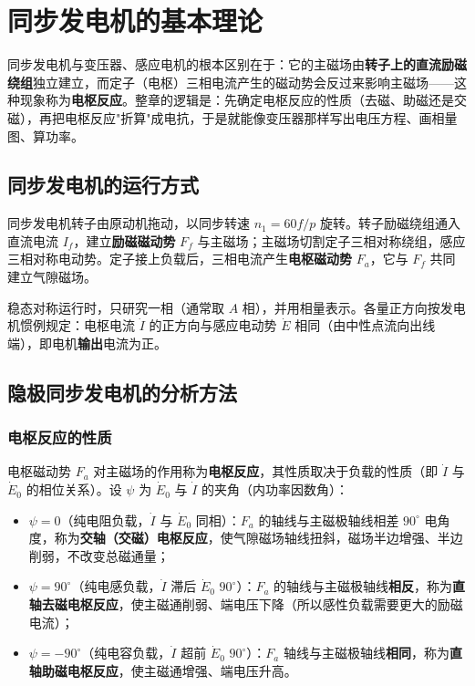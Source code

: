 \chapter{同步发电机的基本理论}

同步发电机与变压器、感应电机的根本区别在于：它的主磁场由\textbf{转子上的直流励磁绕组}独立建立，而定子（电枢）三相电流产生的磁动势会反过来影响主磁场——这种现象称为\textbf{电枢反应}。整章的逻辑是：先确定电枢反应的性质（去磁、助磁还是交磁），再把电枢反应"折算"成电抗，于是就能像变压器那样写出电压方程、画相量图、算功率。

\section{同步发电机的运行方式}

同步发电机转子由原动机拖动，以同步转速 $n_1=60f/p$ 旋转。转子励磁绕组通入直流电流 $I_f$，建立\textbf{励磁磁动势} $F_f$ 与主磁场；主磁场切割定子三相对称绕组，感应三相对称电动势。定子接上负载后，三相电流产生\textbf{电枢磁动势} $F_a$，它与 $F_f$ 共同建立气隙磁场。

稳态对称运行时，只研究一相（通常取 $A$ 相），并用相量表示。各量正方向按发电机惯例规定：电枢电流 $\dot I$ 的正方向与感应电动势 $\dot E$ 相同（由中性点流向出线端），即电机\textbf{输出}电流为正。

\section{隐极同步发电机的分析方法}

\subsection{电枢反应的性质}
电枢磁动势 $F_a$ 对主磁场的作用称为\textbf{电枢反应}，其性质取决于负载的性质（即 $\dot I$ 与 $\dot E_0$ 的相位关系）。设 $\psi$ 为 $\dot E_0$ 与 $\dot I$ 的夹角（内功率因数角）：
\begin{itemize}
  \item $\psi=0$（纯电阻负载，$\dot I$ 与 $\dot E_0$ 同相）：$F_a$ 的轴线与主磁极轴线相差 $90^\circ$ 电角度，称为\textbf{交轴（交磁）电枢反应}，使气隙磁场轴线扭斜，磁场半边增强、半边削弱，不改变总磁通量；
  \item $\psi=90^\circ$（纯电感负载，$\dot I$ 滞后 $\dot E_0$ $90^\circ$）：$F_a$ 的轴线与主磁极轴线\textbf{相反}，称为\textbf{直轴去磁电枢反应}，使主磁通削弱、端电压下降（所以感性负载需要更大的励磁电流）；
  \item $\psi=-90^\circ$（纯电容负载，$\dot I$ 超前 $\dot E_0$ $90^\circ$）：$F_a$ 轴线与主磁极轴线\textbf{相同}，称为\textbf{直轴助磁电枢反应}，使主磁通增强、端电压升高。
\end{itemize}

